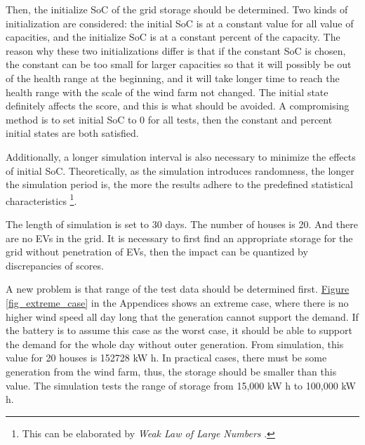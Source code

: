 \documentclass[12pt,a4paper]{report}
\begin{document}
            Then, the initialize SoC of the grid storage should be determined. Two kinds of initialization are considered: the initial SoC is at a constant value for all value of capacities, and the initialize SoC is at a constant percent of the capacity. The reason why these two initializations differ is that if the constant SoC is chosen, the constant can be too small for larger capacities so that it will possibly be out of the health range at the beginning, and it will take longer time to reach the health range with the scale of the wind farm not changed. The initial state definitely affects the score, and this is what should be avoided. A compromising method is to set initial SoC to 0 for all tests, then the constant and percent initial states are both satisfied.

            Additionally, a longer simulation interval is also necessary to minimize the effects of initial SoC. Theoretically, as the simulation introduces randomness, the longer the simulation period is, the more the results adhere to the predefined statistical characteristics \footnote{This can be elaborated by \emph{Weak Law of Large Numbers} \cite{paper:wlln}.}.

            The length of simulation is set to 30 days. The number of houses is 20. And there are no EVs in the grid. It is necessary to first find an appropriate storage for the grid without penetration of EVs, then the impact can be quantized by discrepancies of scores.

            A new problem is that range of the test data should be determined first. \hyperref[fig_extreme_case]{Figure \ref*{fig_extreme_case}} in the Appendices shows an extreme case, where there is no higher wind speed all day long that the generation cannot support the demand. If the battery is to assume this case as the worst case, it should be able to support the demand for the whole day without outer generation. From simulation, this value for 20 houses is 152728 kW h. In practical cases, there must be some generation from the wind farm, thus, the storage should be smaller than this value. The simulation tests the range of storage from 15,000 kW h to 100,000 kW h.
\end{document}
